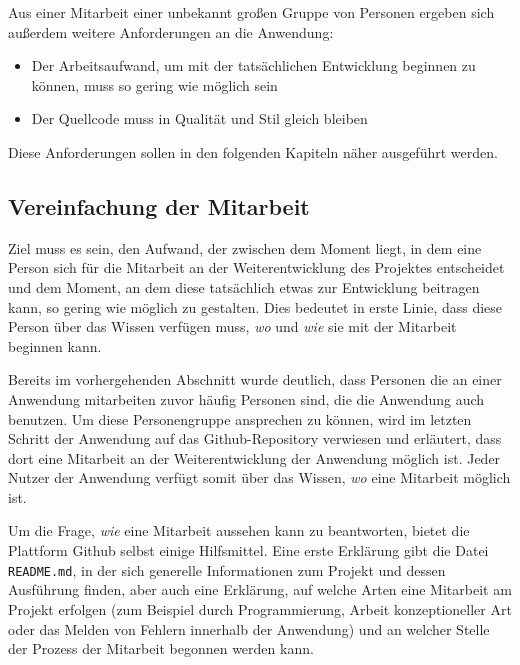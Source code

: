 Aus einer Mitarbeit einer unbekannt großen Gruppe von Personen ergeben sich außerdem weitere Anforderungen an die Anwendung:

\begin{itemize}
  \item Der Arbeitsaufwand, um mit der tatsächlichen Entwicklung beginnen zu können, muss so gering wie möglich sein
  \item Der Quellcode muss in Qualität und Stil gleich bleiben
\end{itemize}

Diese Anforderungen sollen in den folgenden Kapiteln näher ausgeführt werden.

\subsection{Vereinfachung der Mitarbeit}
\label{chap:contribution}
Ziel muss es sein, den Aufwand, der zwischen dem Moment liegt, in dem eine Person sich für die Mitarbeit an der Weiterentwicklung des Projektes entscheidet und dem Moment, an dem diese tatsächlich etwas zur Entwicklung beitragen kann, so gering wie möglich zu gestalten.
Dies bedeutet in erste Linie, dass diese Person über das Wissen verfügen muss, \textit{wo} und \textit{wie} sie mit der Mitarbeit beginnen kann.

Bereits im vorhergehenden Abschnitt wurde deutlich, dass Personen die an einer Anwendung mitarbeiten zuvor häufig Personen sind, die die Anwendung auch benutzen. Um diese Personengruppe ansprechen zu können, wird im letzten Schritt der Anwendung auf das Github-Repository verwiesen und erläutert, dass dort eine Mitarbeit an der Weiterentwicklung der Anwendung möglich ist. Jeder Nutzer der Anwendung verfügt somit über das Wissen, \textit{wo} eine Mitarbeit möglich ist.

Um die Frage, \textit{wie} eine Mitarbeit aussehen kann zu beantworten, bietet die Plattform Github selbst einige Hilfsmittel\footnotemark{}.
Eine erste Erklärung gibt die Datei \verb|README.md|, in der sich generelle Informationen zum Projekt und dessen Ausführung finden, aber auch eine Erklärung, auf welche Arten eine Mitarbeit am Projekt erfolgen (zum Beispiel durch Programmierung, Arbeit konzeptioneller Art oder das Melden von Fehlern innerhalb der Anwendung) und an welcher Stelle der Prozess der Mitarbeit begonnen werden kann.




